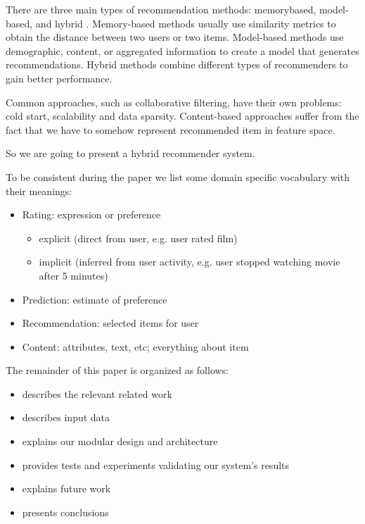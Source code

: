 \documentclass{article}
\begin{document}
     There are three main types of recommendation methods: memorybased, model-based, and hybrid \citep{survey}. Memory-based methods \citep{memory} usually use similarity metrics to obtain the distance between two users or two items. Model-based methods use demographic, content, or aggregated information to create a model that generates recommendations. Hybrid \citep{combining} methods combine different types of recommenders to gain better performance.

    Common approaches, such as collaborative filtering, have their own problems: cold start, scalability and data sparsity. Content-based approaches suffer from the fact that we have to somehow represent recommended item in feature space.

    So we are going to present a hybrid recommender system.
    
    To be consistent during the paper we list some domain specific vocabulary with their meanings:

        \begin{itemize}
            \item Rating: expression or preference

                \begin{itemize}
                    \item explicit (direct from user, e.g. user rated film)
                    \item implicit (inferred from user activity, e.g. user stopped watching movie after 5 minutes)
                \end{itemize}
            \item Prediction: estimate of preference
            \item Recommendation: selected items for user
            \item Content: attributes, text, etc; everything about item
        \end{itemize}


    The remainder of this paper is organized as follows:
    
        \begin{itemize}
            \item {} describes the relevant related work
            \item {} describes input data
            \item {} explains our modular design and architecture
            \item {} provides tests and experiments validating
our system’s results
            \item {} explains future work
            \item {} presents conclusions
        \end{itemize}
\end{document}
